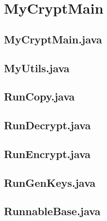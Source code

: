 \section{MyCryptMain}
\subsection{MyCryptMain.java}

\clearpage

\subsection{MyUtils.java}

\clearpage

\subsection{RunCopy.java}

\clearpage

\subsection{RunDecrypt.java}

\clearpage

\subsection{RunEncrypt.java}

\clearpage

\subsection{RunGenKeys.java}

\clearpage

\subsection{RunnableBase.java}

\clearpage

